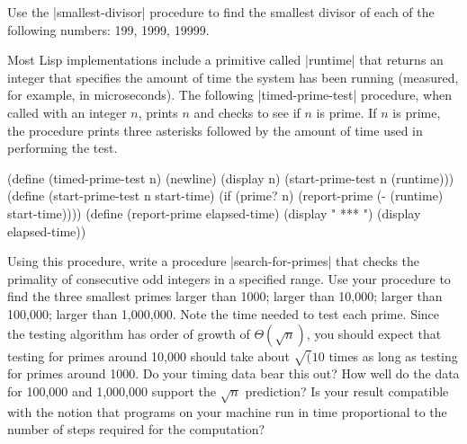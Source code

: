 \begin{Exercise}
\label{exc:1.21}
Use the \scheme|smallest-divisor| procedure to find the smallest divisor
of each of the following numbers: 199, 1999, 19999.
\end{Exercise}

\begin{Exercise}
\label{exc:1.22}
Most Lisp implementations include a primitive called \scheme|runtime|
that returns an integer that specifies the amount of time the system
has been running (measured, for example, in microseconds).  The
following \scheme|timed-prime-test| procedure, when called with an
integer $n$, prints $n$ and checks to see if $n$ is prime.  If $n$ is
prime, the procedure prints three asterisks followed by the amount of time
used in performing the test.

\begin{schemedisplay}
(define (timed-prime-test n)
  (newline)
  (display n)
  (start-prime-test n (runtime)))
(define (start-prime-test n start-time)
  (if (prime? n)
      (report-prime (- (runtime) start-time))))
(define (report-prime elapsed-time)
  (display " *** ")
  (display elapsed-time))
\end{schemedisplay}
Using this procedure, write a procedure \scheme|search-for-primes| that
checks the primality of consecutive odd integers in a specified range.
Use your procedure to find the three smallest primes larger than 1000;
larger than 10,000; larger than 100,000; larger than 1,000,000.  Note
the time needed to test each prime.  Since the testing algorithm has
order of growth of $\Theta(\sqrt n)$, you should expect that testing
for primes around 10,000 should take about $\sqrt( 10$ times as long
as testing for primes around 1000.  Do your timing data bear this out?
How well do the data for 100,000 and 1,000,000 support the $\sqrt n$
prediction?  Is your result compatible with the notion that programs
on your machine run in time proportional to the number of steps
required for the computation?
\end{Exercise}

